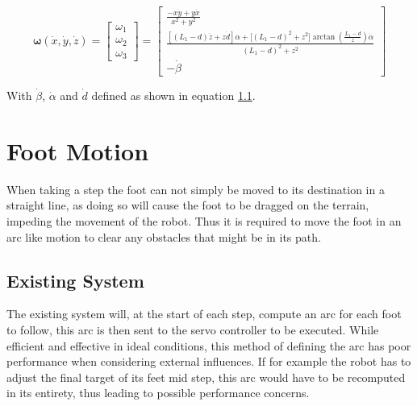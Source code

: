     \begin{equation}\label{eq:rate}
        \boldsymbol{\omega}(\dot{x}, \dot{y}, \dot{z}) =
                            \begin{bmatrix}
                                \omega_1\\
                                \omega_2\\
                                \omega_3
                            \end{bmatrix}
                            =
                            \begin{bmatrix}
                                \displaystyle \frac{- x\dot{y} + y \dot{x}}{x^2 + y^2}\\[0.5cm]
                                \displaystyle \frac{\left[(L_1 - d)\dot{z} + z\dot{d}\right]\alpha + \Big[(L_1 - d)^2 + z^2\Big]\arctan{\left(\displaystyle\frac{L_1-d}{z}\right)}\dot{\alpha}}{(L_1 - d)^2 + z^2}\\[0.8cm]
                                -\dot{\beta} 
                            \end{bmatrix}
    \end{equation}

    With \(\dot\beta\), \(\dot\alpha\) and \(\dot{d}\) defined as shown in equation \ref{}.

\newpage
\section{Foot Motion} \label{sec:arc_generation}
    When taking a step the foot can not simply be moved to its destination in a straight line, as doing so will cause the foot to be dragged on the terrain,
    impeding the movement of the robot. Thus it is required to move the foot in an arc like motion to clear any obstacles that might be in its path.

    \subsection{Existing System}
        The existing system will, at the start of each step, compute an arc for each foot to follow, this arc is then sent to the servo controller
        to be executed. While efficient and effective in ideal conditions, this method of defining the arc has poor performance when considering external
        influences. If for example the robot has to adjust the final target of its feet mid step, this arc would have to be recomputed in its entirety,
        thus leading to possible performance concerns.

